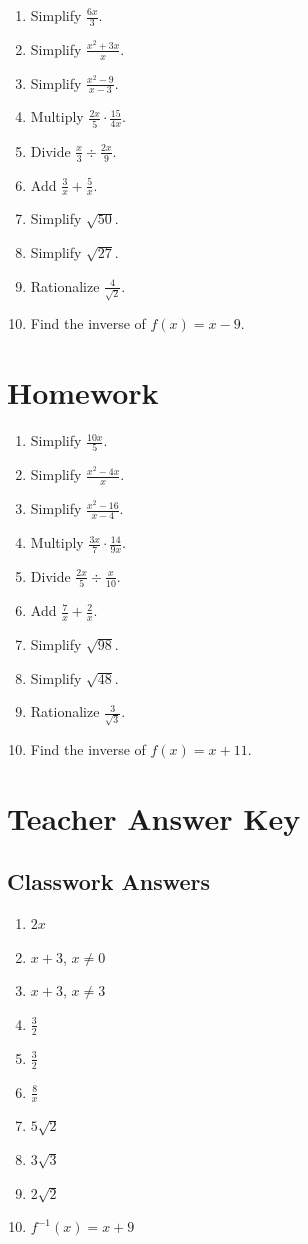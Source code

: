 \documentclass[11pt]{book}
\begin{document}
\begin{enumerate}
\item Simplify \(\frac{6x}{3}\).
\item Simplify \(\frac{x^2+3x}{x}\).
\item Simplify \(\frac{x^2-9}{x-3}\).
\item Multiply \(\frac{2x}{5}\cdot\frac{15}{4x}\).
\item Divide \(\frac{x}{3}\div\frac{2x}{9}\).
\item Add \(\frac{3}{x}+\frac{5}{x}\).
\item Simplify \(\sqrt{50}\).
\item Simplify \(\sqrt{27}\).
\item Rationalize \(\frac{4}{\sqrt2}\).
\item Find the inverse of \(f(x)=x-9\).
\end{enumerate}

\section{Homework}

\begin{enumerate}
\item Simplify \(\frac{10x}{5}\).
\item Simplify \(\frac{x^2-4x}{x}\).
\item Simplify \(\frac{x^2-16}{x-4}\).
\item Multiply \(\frac{3x}{7}\cdot\frac{14}{9x}\).
\item Divide \(\frac{2x}{5}\div\frac{x}{10}\).
\item Add \(\frac{7}{x}+\frac{2}{x}\).
\item Simplify \(\sqrt{98}\).
\item Simplify \(\sqrt{48}\).
\item Rationalize \(\frac{3}{\sqrt3}\).
\item Find the inverse of \(f(x)=x+11\).
\end{enumerate}

\section{Teacher Answer Key}

\subsection{Classwork Answers}

\begin{enumerate}
\item \(2x\)
\item \(x+3\), \(x\ne0\)
\item \(x+3\), \(x\ne3\)
\item \(\frac32\)
\item \(\frac32\)
\item \(\frac8x\)
\item \(5\sqrt2\)
\item \(3\sqrt3\)
\item \(2\sqrt2\)
\item \(f^{-1}(x)=x+9\)
\end{enumerate}
\end{document}
